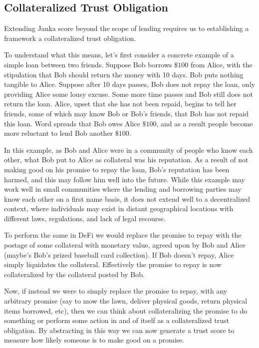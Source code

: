 \documentclass{article}
\begin{document}
\subsection{Collateralized Trust Obligation}
Extending Janka score beyond the scope of lending requires us to establishing a framework a collateralized trust obligation. 

To understand what this means, let's first consider a concrete example of a simple loan between two friends. Suppose Bob borrows $\$100$ from Alice, with the stipulation that Bob should return the money with 10 days. Bob puts nothing tangible to Alice. Suppose after 10 days passes, Bob does not repay the loan, only providing Alice some lousy excuse. Some more time passes and Bob still does not return the loan. Alice, upset that she has not been repaid, begins to tell her friends, some of which may know Bob or Bob's friends, that Bob has not repaid this loan. Word spreads that Bob owes Alice $\$100$, and as a result people become more reluctant to lend Bob another $\$100$.

In this example, as Bob and Alice were in a community of people who know each other, what Bob put to Alice as collateral was his reputation. As a result of not making good on his promise to repay the loan, Bob's reputation has been harmed, and this may follow him well into the future. While this example may work well in small communities where the lending and borrowing parties may know each other on a first name basis, it does not extend well to a decentralized context, where individuals may exist in distant geographical locations with different laws, regulations, and lack of legal recourse.

To perform the same in DeFi we would replace the promise to repay with the postage of some collateral with monetary value, agreed upon by Bob and Alice (maybe's Bob's prized baseball card collection). If Bob doesn't repay, Alice simply liquidates the collateral. Effectively the promise to repay is now collateralized by the collateral posted by Bob. 

Now, if instead we were to simply replace the promise to repay, with any arbitrary promise (say to mow the lawn, deliver physical goods, return physical items borrowed, etc), then we can think about collateralizing the promise to do something or perform some action in and of itself as a collateralized trust obligation. By abstracting in this way we can now generate a trust score to measure how likely someone is to make good on a promise.
\end{document}
